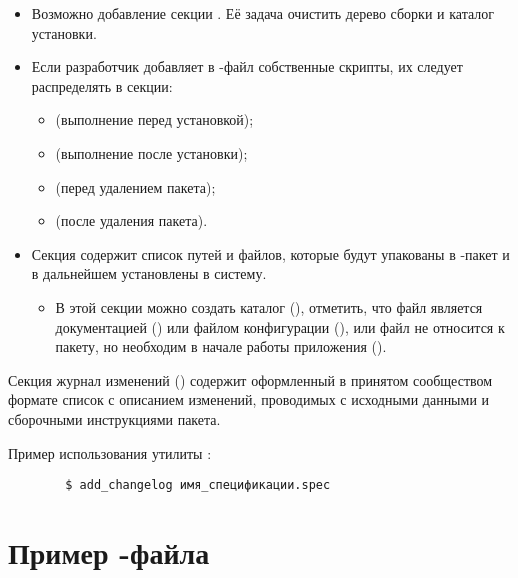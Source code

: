\begin{itemize}
	\item Возможно добавление секции . Её задача очистить дерево сборки и каталог установки.
	\item Если разработчик добавляет в -файл собственные скрипты, их следует распределять в секции:
	\begin{itemize}
		\item {} (выполнение перед установкой);
		\item {} (выполнение после установки);
		\item {} (перед удалением пакета);
		\item {} (после удаления пакета).
	\end{itemize}
	\item Секция  содержит список путей и файлов, которые будут упакованы в -пакет
		и в дальнейшем установлены в систему.
	\begin{itemize}
		\item В этой секции можно создать каталог (), отметить, что файл является
			документацией () или файлом конфигурации (), или файл не
			относится к пакету, но необходим в начале работы приложения ().
	\end{itemize}
\end{itemize}



Секция журнал изменений () содержит оформленный в принятом сообществом формате список
с описанием изменений, проводимых с исходными данными и сборочными инструкциями пакета.


Пример использования утилиты :
\begin{verbatim}
        $ add_changelog имя_спецификации.spec
\end{verbatim}

\section{Пример -файла}


